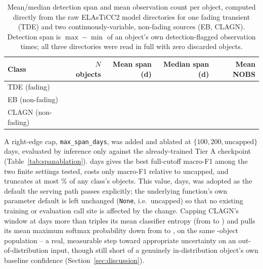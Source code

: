 \begin{table}[htb]
\centering
\caption{Mean/median detection span and mean observation count per object,
computed directly from the raw ELAsTiCC2 model directories for one fading
transient (TDE) and two continuously-variable, non-fading sources (EB,
CLAGN). Detection span is $\max{-}\min$ of an object's own detection-flagged
observation times; all three directories were read in full with zero
discarded objects.}
\label{tab:spans}
\begin{tabular}{lrrrr}
\toprule
Class & $N$ objects & Mean span (d) & Median span (d) & Mean NOBS \\
\midrule
TDE (fading) & \ExoticNObjectsTDE{} & \ExoticSpanMeanTDE{} &
  \ExoticSpanMedianTDE{} & \ExoticNobsMeanTDE{} \\
EB (non-fading) & \ExoticNObjectsEB{} & \ExoticSpanMeanEB{} &
  \ExoticSpanMedianEB{} & \ExoticNobsMeanEB{} \\
CLAGN (non-fading) & \ExoticNObjectsCLAGN{} & \ExoticSpanMeanCLAGN{} &
  \ExoticSpanMedianCLAGN{} & \ExoticNobsMeanCLAGN{} \\
\bottomrule
\end{tabular}
\end{table}

A right-edge cap, \texttt{max\_span\_days}, was added and ablated at
$\{100, 200, \text{uncapped}\}$ days, evaluated by inference only against
the already-trained Tier A checkpoint (Table~\ref{tab:spanablation}).
\SpanChosenDefault{} days gives the best full-cutoff macro-F1 among the two finite settings
tested, costs only \SpanTwoHundredCost{} macro-F1 relative to uncapped, and
truncates at most \SpanTwoHundredMaxAffected{}\% of any class's objects. This value, \SpanChosenDefault{} days, was
adopted as the default the serving path passes explicitly; the underlying
function's own parameter default is left unchanged (\texttt{None}, i.e.\
uncapped) so that no existing training or evaluation call site is affected
by the change. Capping CLAGN's window at \SpanChosenDefault{} days more than triples its
mean classifier entropy (from \ClagnEntropyUncapped{} to
\ClagnEntropyCapped{}) and pulls its mean maximum softmax probability down
from \ClagnMaxProbUncapped{} to \ClagnMaxProbCapped{}, on the same
\ClagnNObjects{}-object population -- a real, measurable step toward
appropriate uncertainty on an out-of-distribution input, though still short
of a genuinely in-distribution object's own baseline confidence
(Section~\ref{sec:discussion}).

